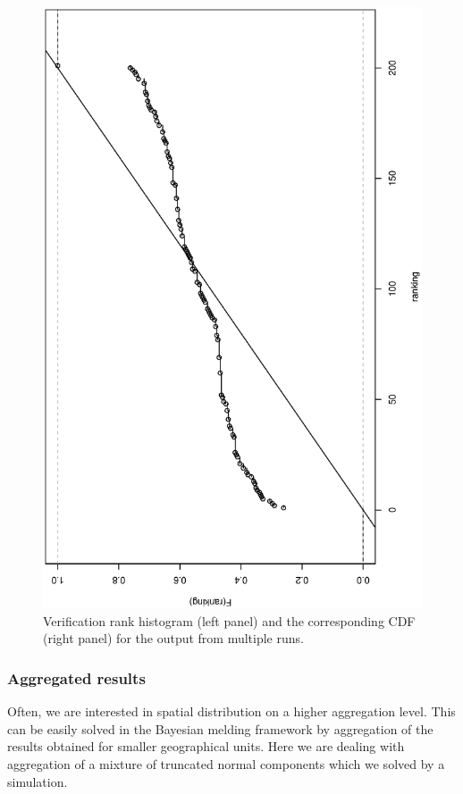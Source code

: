 \documentclass[11pt, fleqn]{article}
\begin{document}
\begin{figure}[t]
\begin{center}
\begin{minipage}{8cm}
\includegraphics[scale=0.3, angle=-90]{pic/mr_pit_cdf_present.ps}
\end{minipage}
\caption{\label{fig:mr-vrh}\small  Verification rank histogram (left panel) and
  the corresponding CDF (right panel) for the output from multiple runs.}
\end{center}
\end{figure}

\subsubsection{Aggregated results}
%
Often, we are interested in spatial distribution on a higher aggregation
level. This can be easily solved in the Bayesian melding framework by
aggregation of the results obtained for smaller geographical units. 
Here we are dealing with aggregation of a mixture of truncated normal
components which we solved by a simulation.
\end{document}
